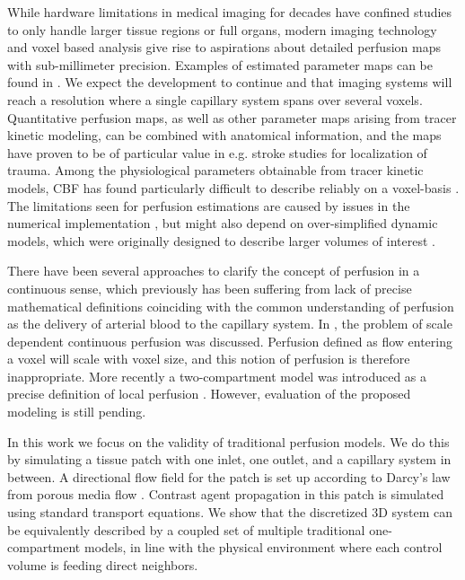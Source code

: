 \documentclass[journal,twocolumn]{IEEEtran}
\begin{document}
	While hardware limitations in medical imaging for decades have confined studies to only handle larger tissue regions or full organs, modern imaging technology and voxel based analysis give rise to aspirations about detailed perfusion maps with sub-millimeter precision. Examples of estimated parameter maps can be found in \cite{Feng2013,Chen2011}. We expect the development to continue and that imaging systems will reach a resolution where a single capillary system spans over several voxels.
	Quantitative perfusion maps, as well as other parameter maps arising from tracer kinetic modeling, can be combined with anatomical information, and the maps have proven to be of particular value in e.g. stroke studies for localization of trauma. 
	Among the physiological parameters obtainable from tracer kinetic models, CBF has found particularly difficult to describe reliably on a voxel-basis \cite{kudo10}.
	The limitations seen for perfusion estimations are caused by issues in the numerical implementation \cite{kudo10}, but might also depend on over-simplified dynamic models, which were originally designed to describe larger volumes of interest \cite{zierler00}.	
	
	There have been several approaches to clarify the concept of perfusion in a continuous sense, which previously has been suffering from lack of precise mathematical definitions coinciding with the common understanding of perfusion as the delivery of arterial blood to the capillary system.
	In \cite{Henkelman1990}, the problem of scale dependent continuous perfusion was discussed. Perfusion defined as flow entering a voxel will scale with voxel size, 
	and this notion of perfusion is therefore inappropriate.	
	More recently a two-compartment model was introduced as a precise definition of local perfusion \cite{sourbron14}.	
	However, evaluation of the proposed modeling is still pending.
	
	In this work we focus on the validity of traditional perfusion models.
	We do this by simulating a tissue patch with one inlet, one outlet, and a capillary system in between.
	A directional flow field for the patch is set up according to Darcy's law from porous media flow \cite{Darcy56}.
	Contrast agent propagation in this patch is simulated using standard transport equations.
	We show that the discretized 3D system can be equivalently described by a coupled set of multiple traditional one-compartment models, in line with the physical environment where each control volume is feeding direct neighbors.
	
\end{document}
